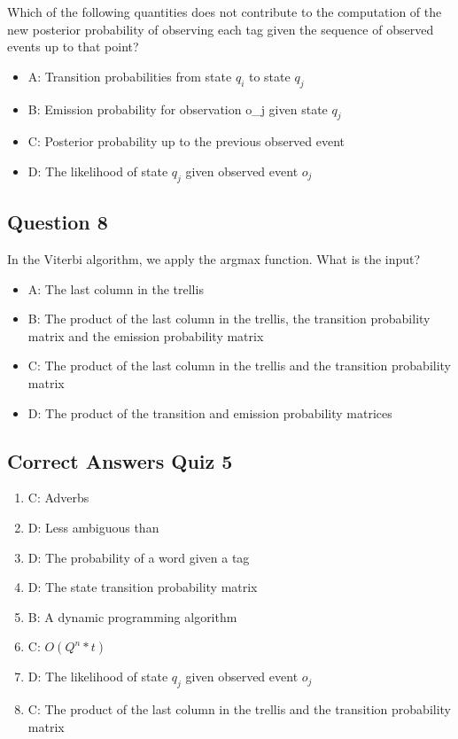 \documentclass[
  11pt,
  british,
]{article}
\providecommand{\tightlist}{%
  \setlength{\itemsep}{0pt}\setlength{\parskip}{0pt}}
\begin{document}
Which of the following quantities does not contribute to the computation
of the new posterior probability of observing each tag given the
sequence of observed events up to that point?

\begin{itemize}
\tightlist
\item
  A: Transition probabilities from state \(q_i\) to state \(q_j\)
\item
  B: Emission probability for observation o\_j given state \(q_j\)
\item
  C: Posterior probability up to the previous observed event
\item
  D: The likelihood of state \(q_j\) given observed event \(o_j\)
\end{itemize}

\hypertarget{question-8-1}{%
\subsection{Question 8}\label{question-8-1}}

In the Viterbi algorithm, we apply the argmax function. What is the
input?

\begin{itemize}
\tightlist
\item
  A: The last column in the trellis
\item
  B: The product of the last column in the trellis, the transition
  probability matrix and the emission probability matrix
\item
  C: The product of the last column in the trellis and the transition
  probability matrix
\item
  D: The product of the transition and emission probability matrices
\end{itemize}

\hypertarget{correct-answers-quiz-5}{%
\subsection{Correct Answers Quiz 5}\label{correct-answers-quiz-5}}

\begin{enumerate}
\def\labelenumi{\arabic{enumi}.}
\tightlist
\item
  C: Adverbs
\item
  D: Less ambiguous than
\item
  D: The probability of a word given a tag
\item
  D: The state transition probability matrix
\item
  B: A dynamic programming algorithm
\item
  C: \(O(Q^n*t)\)
\item
  D: The likelihood of state \(q_j\) given observed event \(o_j\)
\item
  C: The product of the last column in the trellis and the transition
  probability matrix
\end{enumerate}
\end{document}
